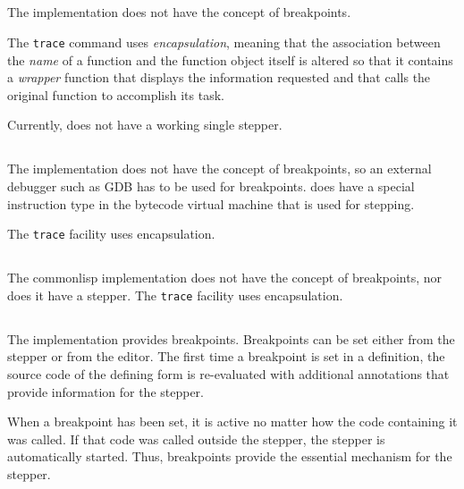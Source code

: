 \subsection{\ccl{}}

The \ccl{} \commonlisp{} implementation does not have the concept of
breakpoints.

The \ccl{} \texttt{trace} command uses \emph{encapsulation}, meaning
that the association between the \emph{name} of a function and the
function object itself is altered so that it contains a \emph{wrapper}
function that displays the information requested and that calls the
original function to accomplish its task.

Currently, \ccl{} does not have a working single stepper.

\subsection{\ecl{}}

The \ecl{} \commonlisp{} implementation does not have the concept of
breakpoints, so an external debugger such as GDB has to be used for
breakpoints.  \ecl{} does have a special instruction type in the bytecode
virtual machine that is used for stepping.

The \texttt{trace} facility uses encapsulation.

\subsection{\clasp{}}

The \clasp{} commonlisp{} implementation does not have the concept of
breakpoints, nor does it have a stepper.  The \texttt{trace} facility
uses encapsulation.

\subsection{\lispworks{}}

The \lispworks{} \commonlisp{} implementation provides breakpoints.
Breakpoints can be set either from the stepper or from the editor.
The first time a breakpoint is set in a definition, the source code of
the defining form is re-evaluated with additional annotations that
provide information for the stepper.

When a breakpoint has been set, it is active no matter how the code
containing it was called.  If that code was called outside the
stepper, the stepper is automatically started.  Thus, breakpoints
provide the essential mechanism for the stepper.

